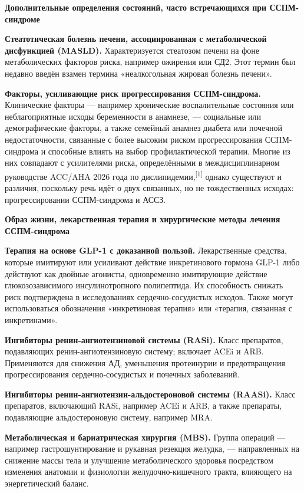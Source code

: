 \documentclass[11pt,a4paper]{article}
\newcommand{\src}[1]{\textsuperscript{[#1]}}
\newcommand{\heading}[1]{\par\medskip\textbf{#1}\par}
\begin{document}
\heading{Дополнительные определения состояний, часто встречающихся при ССПМ-синдроме}
\textbf{Стеатотическая болезнь печени, ассоциированная с метаболической дисфункцией (MASLD).} Характеризуется стеатозом печени на фоне метаболических факторов риска, например ожирения или СД2. Этот термин был недавно введён взамен термина «неалкогольная жировая болезнь печени».

\textbf{Факторы, усиливающие риск прогрессирования ССПМ-синдрома.} Клинические факторы --- например хронические воспалительные состояния или неблагоприятные исходы беременности в анамнезе, --- социальные или демографические факторы, а также семейный анамнез диабета или почечной недостаточности, связанные с более высоким риском прогрессирования ССПМ-синдрома и способные влиять на выбор профилактической терапии. Многие из них совпадают с усилителями риска, определёнными в междисциплинарном руководстве ACC/AHA 2026 года по дислипидемии,\src{1} однако существуют и различия, поскольку речь идёт о двух связанных, но не тождественных исходах: прогрессировании ССПМ-синдрома и АССЗ.

\heading{Образ жизни, лекарственная терапия и хирургические методы лечения ССПМ-синдрома}
\textbf{Терапия на основе GLP-1 с доказанной пользой.} Лекарственные средства, которые имитируют или усиливают действие инкретинового гормона GLP-1 либо действуют как двойные агонисты, одновременно имитирующие действие глюкозозависимого инсулинотропного полипептида. Их способность снижать риск подтверждена в исследованиях сердечно-сосудистых исходов. Также могут использоваться обозначения «инкретиновая терапия» или «терапия, связанная с инкретинами».

\textbf{Ингибиторы ренин-ангиотензиновой системы (RASi).} Класс препаратов, подавляющих ренин-ангиотензиновую систему; включает ACEi и ARB. Применяются для снижения АД, уменьшения протеинурии и предотвращения прогрессирования сердечно-сосудистых и почечных заболеваний.

\textbf{Ингибиторы ренин-ангиотензин-альдостероновой системы (RAASi).} Класс препаратов, включающий RASi, например ACEi и ARB, а также препараты, подавляющие альдостероновую систему, например MRA.

\textbf{Метаболическая и бариатрическая хирургия (MBS).} Группа операций --- например гастрошунтирование и рукавная резекция желудка, --- направленных на снижение массы тела и улучшение метаболического здоровья посредством изменения анатомии и физиологии желудочно-кишечного тракта, влияющего на энергетический баланс.
\end{document}
